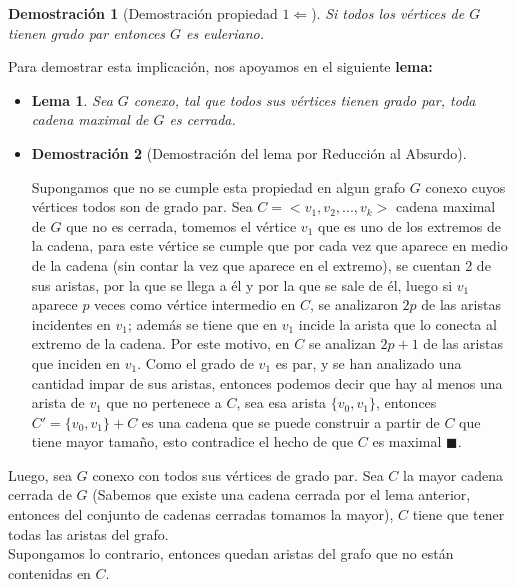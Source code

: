 \documentclass[a4paper,1pt]{report}
\newtheorem*{dem}{Demostración}
\newtheorem*{lem}{Lema}
\begin{document}
\begin{dem}[Demostraci\'on propiedad $1 \Leftarrow$] Si todos los v\'ertices de $G$ tienen grado par entonces $G$ es euleriano.\end{dem}

Para demostrar esta implicaci\'on, nos apoyamos en el siguiente \textbf{lema:}
\begin{itemize}
    \item[] \begin{lem}
        Sea $G$ conexo, tal que todos sus v\'ertices tienen grado par, toda cadena maximal de $G$ es cerrada.
        \end{lem}
    \item[] \begin{dem}[Demostración del lema por Reducci\'on al Absurdo]\end{dem}
    Supongamos que no se cumple esta propiedad en algun grafo $G$ conexo cuyos v\'ertices todos son de grado par. 
    Sea $C = <v_1,v_2,...,v_k>$ cadena maximal de $G$ que no es cerrada, tomemos el v\'ertice $v_1$ que es uno de los extremos de la cadena, para este v\'ertice se cumple que por cada vez que aparece en medio de la cadena (sin contar la vez que aparece en el extremo), se cuentan 2 de sus aristas, por la que se llega a \'el y por la que se sale de \'el, luego si $v_1$ aparece $p$ veces como v\'ertice intermedio en $C$, se analizaron $2p$ de las aristas incidentes en $v_1$; adem\'as se tiene que en $v_1$ incide la arista que lo conecta al extremo de la cadena. Por este motivo, en $C$ se analizan $2p +1$ de las aristas que inciden en $v_1$. Como el grado de $v_1$ es par, y se han analizado una cantidad impar de sus aristas, entonces podemos decir que hay al menos una arista de $v_1$ que no pertenece a $C$, sea esa arista $\{v_0, v_1\}$, entonces $C' = \{v_0, v_1\} + C $ es una cadena que se puede construir a partir de $C$ que tiene mayor tama\~no, esto contradice el hecho de que $C$ es maximal $\blacksquare$.
    
\end{itemize}

Luego, sea $G$ conexo con todos sus v\'ertices de grado par. Sea $C$ la mayor cadena cerrada de $G$ (Sabemos que existe una cadena cerrada por el lema anterior, entonces del conjunto de cadenas cerradas tomamos la mayor), $C$ tiene que tener todas las aristas del grafo. \\

Supongamos lo contrario, entonces quedan aristas del grafo que no est\'an contenidas en $C$. \\ 
\end{document}
